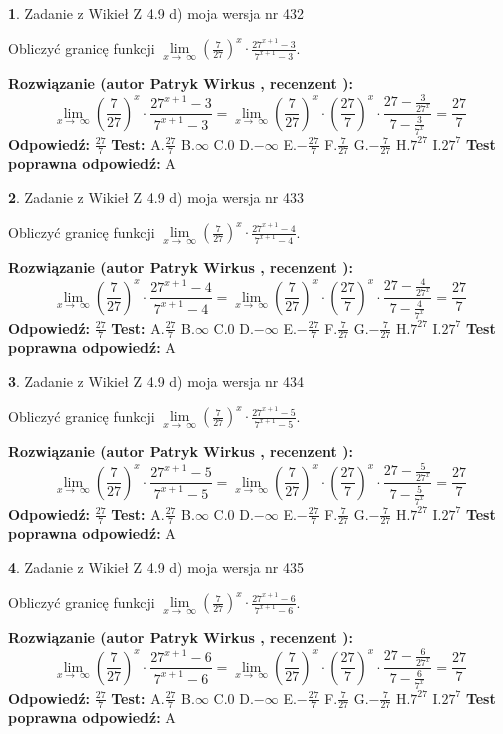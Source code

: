 \documentclass[12pt, a4paper]{article}
\theoremstyle{definition} %
\newtheorem{zad}{}
\newcommand{\zadStart}[1]{\begin{zad}#1\newline}
\newcommand{\zadStop}{\end{zad}}
\newcommand{\rozwStart}[2]{\noindent \textbf{Rozwiązanie (autor #1 , recenzent #2): }\newline}
\newcommand{\rozwStop}{\newline}
\newcommand{\odpStart}{\noindent \textbf{Odpowiedź:}\newline}
\newcommand{\odpStop}{\newline}
\newcommand{\testStart}{\noindent \textbf{Test:}\newline}
\newcommand{\testStop}{\newline}
\newcommand{\kluczStart}{\noindent \textbf{Test poprawna odpowiedź:}\newline}
\newcommand{\kluczStop}{\newline}
\begin{document}
\zadStart{Zadanie z Wikieł Z 4.9 d) moja wersja nr 432}


Obliczyć granicę funkcji  $\lim\limits_{x\to\ \infty}(\frac{7}{27})^{x}\cdot\frac{27^{x+1}-3}{7^{x+1}-3}$.
\zadStop
\rozwStart{Patryk Wirkus}{}
$$\lim\limits_{x\to\ \infty}(\frac{7}{27})^{x}\cdot\frac{27^{x+1}-3}{7^{x+1}-3}=\lim\limits_{x\to\ \infty}(\frac{7}{27})^{x}\cdot(\frac{27}{7})^{x} \cdot \frac{27-\frac{3}{27^{x}}}{7-\frac{3}{7^{x}}} = \frac{27}{7}$$
\rozwStop
\odpStart
$\frac{27}{7}$
\odpStop
\testStart
A.$\frac{27}{7}$ B.$\infty$ C.$0$ D.$-\infty$ E.$-\frac{27}{7}$
F.$\frac{7}{27}$ G.$-\frac{7}{27}$
H.$7^{27}$
I.$27^{7}$
\testStop
\kluczStart
A
\kluczStop



\zadStart{Zadanie z Wikieł Z 4.9 d) moja wersja nr 433}


Obliczyć granicę funkcji  $\lim\limits_{x\to\ \infty}(\frac{7}{27})^{x}\cdot\frac{27^{x+1}-4}{7^{x+1}-4}$.
\zadStop
\rozwStart{Patryk Wirkus}{}
$$\lim\limits_{x\to\ \infty}(\frac{7}{27})^{x}\cdot\frac{27^{x+1}-4}{7^{x+1}-4}=\lim\limits_{x\to\ \infty}(\frac{7}{27})^{x}\cdot(\frac{27}{7})^{x} \cdot \frac{27-\frac{4}{27^{x}}}{7-\frac{4}{7^{x}}} = \frac{27}{7}$$
\rozwStop
\odpStart
$\frac{27}{7}$
\odpStop
\testStart
A.$\frac{27}{7}$ B.$\infty$ C.$0$ D.$-\infty$ E.$-\frac{27}{7}$
F.$\frac{7}{27}$ G.$-\frac{7}{27}$
H.$7^{27}$
I.$27^{7}$
\testStop
\kluczStart
A
\kluczStop



\zadStart{Zadanie z Wikieł Z 4.9 d) moja wersja nr 434}


Obliczyć granicę funkcji  $\lim\limits_{x\to\ \infty}(\frac{7}{27})^{x}\cdot\frac{27^{x+1}-5}{7^{x+1}-5}$.
\zadStop
\rozwStart{Patryk Wirkus}{}
$$\lim\limits_{x\to\ \infty}(\frac{7}{27})^{x}\cdot\frac{27^{x+1}-5}{7^{x+1}-5}=\lim\limits_{x\to\ \infty}(\frac{7}{27})^{x}\cdot(\frac{27}{7})^{x} \cdot \frac{27-\frac{5}{27^{x}}}{7-\frac{5}{7^{x}}} = \frac{27}{7}$$
\rozwStop
\odpStart
$\frac{27}{7}$
\odpStop
\testStart
A.$\frac{27}{7}$ B.$\infty$ C.$0$ D.$-\infty$ E.$-\frac{27}{7}$
F.$\frac{7}{27}$ G.$-\frac{7}{27}$
H.$7^{27}$
I.$27^{7}$
\testStop
\kluczStart
A
\kluczStop



\zadStart{Zadanie z Wikieł Z 4.9 d) moja wersja nr 435}


Obliczyć granicę funkcji  $\lim\limits_{x\to\ \infty}(\frac{7}{27})^{x}\cdot\frac{27^{x+1}-6}{7^{x+1}-6}$.
\zadStop
\rozwStart{Patryk Wirkus}{}
$$\lim\limits_{x\to\ \infty}(\frac{7}{27})^{x}\cdot\frac{27^{x+1}-6}{7^{x+1}-6}=\lim\limits_{x\to\ \infty}(\frac{7}{27})^{x}\cdot(\frac{27}{7})^{x} \cdot \frac{27-\frac{6}{27^{x}}}{7-\frac{6}{7^{x}}} = \frac{27}{7}$$
\rozwStop
\odpStart
$\frac{27}{7}$
\odpStop
\testStart
A.$\frac{27}{7}$ B.$\infty$ C.$0$ D.$-\infty$ E.$-\frac{27}{7}$
F.$\frac{7}{27}$ G.$-\frac{7}{27}$
H.$7^{27}$
I.$27^{7}$
\testStop
\kluczStart
A
\kluczStop
\end{document}
